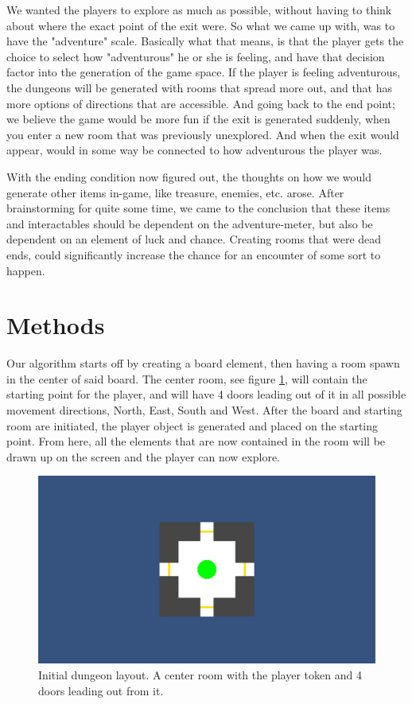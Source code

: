\documentclass[conference,compsoc]{IEEEtran}
\begin{document}
We wanted the players to explore as much as possible, without having to think about where the exact point of the exit were. So what we came up with, was to have the "adventure" scale. Basically what that means, is that the player gets the choice to select how "adventurous" he or she is feeling, and have that decision factor into the generation of the game space. If the player is feeling adventurous, the dungeons will be generated with rooms that spread more out, and that has more options of directions that are accessible. And going back to the end point; we believe the game would be more fun if the exit is generated suddenly, when you enter a new room that was previously unexplored. And when the exit would appear, would in some way be connected to how adventurous the player was.

With the ending condition now figured out, the thoughts on how we would generate other items in-game, like treasure, enemies, etc. arose. After brainstorming for quite some time, we came to the conclusion that these items and interactables should be dependent on the adventure-meter, but also be dependent on an element of luck and chance.
Creating rooms that were dead ends, could significantly increase the chance for an encounter of some sort to happen.

\section{Methods}
Our algorithm starts off by creating a board element, then having a room spawn in the center of said board. The center room, see figure \ref{fig:startroom}, will contain the starting point for the player, and will have 4 doors leading out of it in all possible movement directions, North, East, South and West.
After the board and starting room are initiated, the player object is generated and placed on the starting point. From here, all the elements that are now contained in the room will be drawn up on the screen and the player can now explore.

\begin{figure}[h]
	\graphicspath{{figures/}}
	\includegraphics[width = \columnwidth ]{StartLayout.png}
	\caption{Initial dungeon layout. A center room with the player token and 4 doors leading out from it.}
	\label{fig:startroom}
\end{figure}
\end{document}
